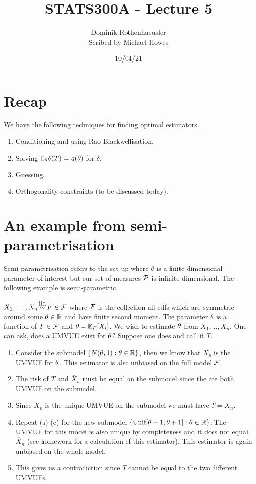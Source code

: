 




\title{STATS300A - Lecture 5}
\author{Dominik Rothenhaeusler\\ Scribed by Michael Howes}
\date{10/04/21}

\pagestyle{fancy}
\fancyhf{}


\maketitle
\tableofcontents
\section{Recap}
We have the following techniques for finding optimal estimators.

\begin{enumerate}
    \item Conditioning and using Rao-Blackwellisation.
    \item Solving ${\mathbb{E}}_{\theta} \delta(T) = g({\theta})$ for $\delta$.
    \item Guessing.
    \item Orthogonality constraints (to be discussed today).
\end{enumerate}

\section{An example from semi-parametrisation}
Semi-parametrisation refers to the set up where $\theta$ is a finite dimensional parameter of interest but our set of measures ${\mathcal{P}}$ is infinite dimensional. The following example is semi-parametric.

$X_1, \ldots, X_n \iid F \in \F$ where ${\mathcal{F}}$ is the collection all cdfs which are symmetric around some ${\theta} \in {\mathbb R}$ and have finite second moment. The parameter ${\theta}$ is a function of $F \in {\mathcal{F}}$ and ${\theta} = {\mathbb{E}}_F[X_i]$. We wish to estimate ${\theta}$ from $X_1,\ldots,X_n$. One can ask, does a UMVUE exist for ${\theta}$? Suppose one does and call it $T$.
\begin{enumerate}
    \item Consider the submodel $\{N({\theta},1):{\theta} \in {\mathbb R}\}$, then we know that $\bar{X}_n$ is the UMVUE for ${\theta}$. This estimator is also unbiased on the full model ${\mathcal{F}}$.
    \item The risk of $T$ and $\bar{X}_n$ must be equal on the submodel since the are both UMVUE on the submodel. 
    \item Since $\bar{X}_n$ is the unique UMVUE on the submodel we must have $T = \bar{X}_n$.
    \item Repeat (a)-(c) for the new submodel $\{\text{Unif}[{\theta}-1,{\theta} + 1]:{\theta} \in {\mathbb R}\}$. The UMVUE for this model is also unique by completeness and it does not equal $\bar{X}_n$ (see homework for a calculation of this estimator). This estimator is again unbiased on the whole model.
    \item This gives us a contradiction since $T$ cannot be equal to the two different UMVUEs.
\end{enumerate}

